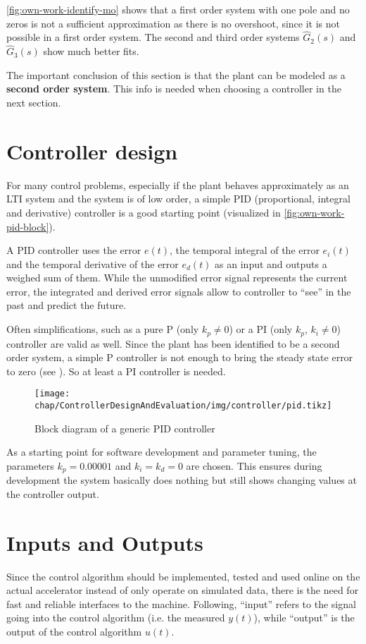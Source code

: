 \autoref{fig:own-work-identify-mo} shows that a first order system with one pole and no zeros is not a sufficient approximation as there is no overshoot, since it is not possible in a first order system. The second and third order systems $\hat{G}_2(s)$ and $\hat{G}_3(s)$ show much better fits.

The important conclusion of this section is that the plant can be modeled as a \textbf{second order system}. This info is needed when choosing a controller in the next section.

\section{Controller design}
For many control problems, especially if the plant behaves approximately as an LTI system and the system is of low order, a simple PID (proportional, integral and derivative) controller is a good starting point (visualized in \autoref{fig:own-work-pid-block}). 

A PID controller uses the error $e(t)$, the temporal integral of the error $e_i(t)$ and the temporal derivative of the error $e_d(t)$ as an input and outputs a weighed sum of them. While the unmodified error signal represents the current error, the integrated and derived error signals allow to controller to ``see'' in the past and predict the future.

Often simplifications, such as a pure P (only $k_p \neq 0$) or a PI (only $k_p,\,k_i \neq 0$) controller are valid as well. Since the plant has been identified to be a second order system, a simple P controller is not enough to bring the steady state error to zero (see ). So at least a PI controller is needed.

\begin{figure}[tb]
	\centering
	\texttt{[image: chap/ControllerDesignAndEvaluation/img/controller/pid.tikz]}
	\caption{Block diagram of a generic PID controller}
	\label{fig:own-work-pid-block}
\end{figure}

As a starting point for software development and parameter tuning, the parameters $k_p=0.00001$ and $k_i=k_d=0$ are chosen. This ensures during development the system basically does nothing but still shows changing values at the controller output.

\section{Inputs and Outputs}
Since the control algorithm should be implemented, tested and used online on the actual accelerator instead of only operate on simulated data, there is the need for fast and reliable interfaces to the machine.
Following, ``input'' refers to the signal going into the control algorithm (i.e. the measured $y(t)$), while ``output'' is the output of the control algorithm $u(t)$.

